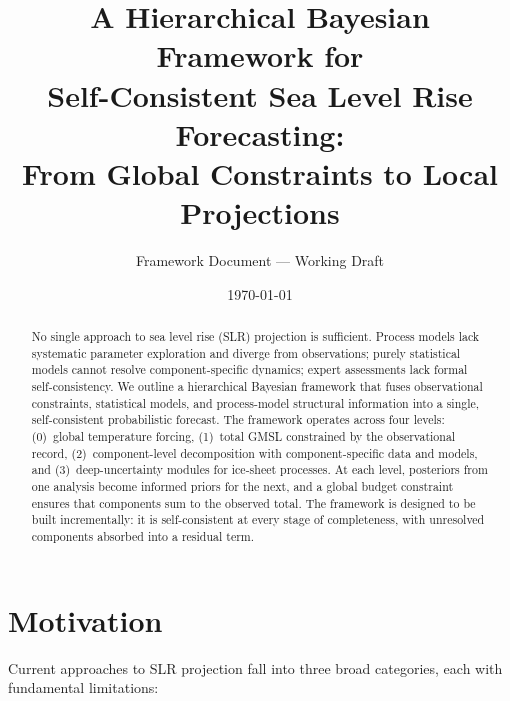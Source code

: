 \documentclass[11pt]{article}
\title{A Hierarchical Bayesian Framework for\\
  Self-Consistent Sea Level Rise Forecasting:\\
  From Global Constraints to Local Projections}
\author{Framework Document — Working Draft}
\date{\today}
\begin{document}
\maketitle

\begin{abstract}
No single approach to sea level rise (SLR) projection is sufficient.  Process models lack systematic parameter exploration and diverge from observations; purely statistical models cannot resolve component-specific dynamics; expert assessments lack formal self-consistency.  We outline a hierarchical Bayesian framework that fuses observational constraints, statistical models, and process-model structural information into a single, self-consistent probabilistic forecast.  The framework operates across four levels: (0)~global temperature forcing, (1)~total GMSL constrained by the observational record, (2)~component-level decomposition with component-specific data and models, and (3)~deep-uncertainty modules for ice-sheet processes.  At each level, posteriors from one analysis become informed priors for the next, and a global budget constraint ensures that components sum to the observed total.  The framework is designed to be built incrementally: it is self-consistent at every stage of completeness, with unresolved components absorbed into a residual term.
\end{abstract}


\section{Motivation}

Current approaches to SLR projection fall into three broad categories, each with fundamental limitations:
\end{document}
